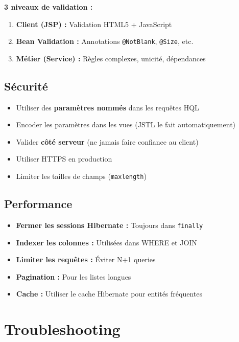 \documentclass[12pt,a4paper]{article}
\begin{document}
\textbf{3 niveaux de validation :}
\begin{enumerate}
    \item \textbf{Client (JSP) :} Validation HTML5 + JavaScript
    \item \textbf{Bean Validation :} Annotations \texttt{@NotBlank}, \texttt{@Size}, etc.
    \item \textbf{Métier (Service) :} Règles complexes, unicité, dépendances
\end{enumerate}

\subsection{Sécurité}

\begin{itemize}
    \item Utiliser des \textbf{paramètres nommés} dans les requêtes HQL
    \item Encoder les paramètres dans les vues (JSTL le fait automatiquement)
    \item Valider \textbf{côté serveur} (ne jamais faire confiance au client)
    \item Utiliser HTTPS en production
    \item Limiter les tailles de champs (\texttt{maxlength})
\end{itemize}

\subsection{Performance}

\begin{itemize}
    \item \textbf{Fermer les sessions Hibernate :} Toujours dans \texttt{finally}
    \item \textbf{Indexer les colonnes :} Utilisées dans WHERE et JOIN
    \item \textbf{Limiter les requêtes :} Éviter N+1 queries
    \item \textbf{Pagination :} Pour les listes longues
    \item \textbf{Cache :} Utiliser le cache Hibernate pour entités fréquentes
\end{itemize}

\newpage

\section{Troubleshooting}
\end{document}
